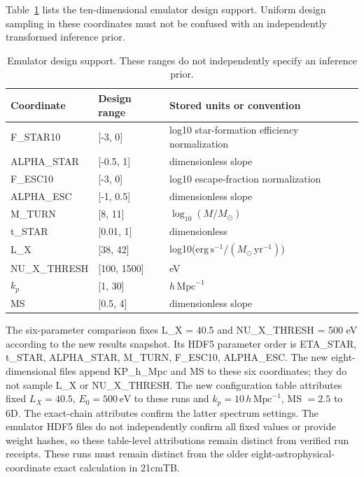 Table~\ref{tab:parameters} lists the ten-dimensional emulator design support. Uniform design sampling in these coordinates must not be confused with an independently transformed inference prior.

\begin{table}[t]
\caption{Emulator design support. These ranges do not independently specify an inference prior.}
\label{tab:parameters}
\centering\small
\begin{tabular}{p{}p{}p{}}
\toprule
Coordinate & Design range & Stored units or convention \\
\midrule
F\_STAR10 & {[}-3, 0{]} & log10 star-formation efficiency normalization \\
ALPHA\_STAR & {[}-0.5, 1{]} & dimensionless slope \\
F\_ESC10 & {[}-3, 0{]} & log10 escape-fraction normalization \\
ALPHA\_ESC & {[}-1, 0.5{]} & dimensionless slope \\
M\_TURN & {[}8, 11{]} & $\log_{10}(M/M_\odot)$ \\
t\_STAR & {[}0.01, 1{]} & dimensionless \\
L\_X & {[}38, 42{]} & log10($\mathrm{erg\,s^{-1}}/(M_\odot\,\mathrm{yr^{-1}})$) \\
NU\_X\_THRESH & {[}100, 1500{]} & eV \\
\ensuremath{k_p} & {[}1, 30{]} & $h\,\mathrm{Mpc}^{-1}$ \\
MS & {[}0.5, 4{]} & dimensionless slope \\
\bottomrule
\end{tabular}
\end{table}

The six-parameter comparison fixes L\_X = 40.5 and NU\_X\_THRESH = 500 eV according to the new results snapshot. Its HDF5 parameter order is ETA\_STAR, t\_STAR, ALPHA\_STAR, M\_TURN, F\_ESC10, ALPHA\_ESC. The new eight-dimensional files append KP\_h\_Mpc and MS to these six coordinates; they do not sample L\_X or NU\_X\_THRESH. The new configuration table attributes fixed $L_X=40.5$, $E_0=500\,\mathrm{eV}$ to these runs and $k_p=10\,h\,\mathrm{Mpc}^{-1}$, MS $=2.5$ to 6D. The exact-chain attributes confirm the latter spectrum settings. The emulator HDF5 files do not independently confirm all fixed values or provide weight hashes, so these table-level attributions remain distinct from verified run receipts. These runs must remain distinct from the older eight-astrophysical-coordinate exact calculation in 21cmTB.

